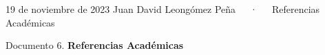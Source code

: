 \documentclass[11pt,a4paper,]{awesome-cv}
\begin{document}
\makecvheader

\makecvfooter
  {19 de noviembre de 2023}
    {Juan David Leongómez Peña~~~·~~~Referencias Académicas}
  {\thepage}





\vspace{4mm}
\begin{tcolorbox}[enhanced,
        on line, 
        boxsep=4pt, left=0pt,right=0pt,top=0pt,bottom=0pt,
        colframe=white,colback=black]
  
\color{white}
\begin{LARGE}\begin{center}
Documento 6. \textbf{Referencias Académicas}
\end{center}\end{LARGE}
\end{tcolorbox}
\end{document}
